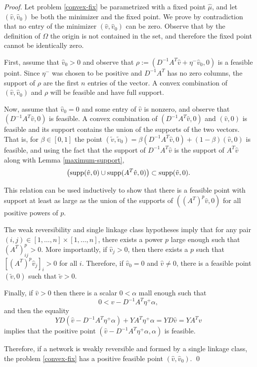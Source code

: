 \documentclass[smallextended]{svjour3}       %
\newcommand*{\supp}{\mbox{\rm supp}}
\newcommand*{\0}{\mathbf{0}}
\newcommand*{\1}{\mathbf{1}}
\begin{document}
\begin{proof}
	Let problem \eqref{convex-fix} be parametrized with a fixed point $\hat\mu$,
	and let $(\hat v, \hat v_0)$ be both the minimizer and the fixed point.  We
	prove by contradiction that no entry of the minimizer $(\hat{v},\hat{v}_0)$
	can be zero. Observe that by the definition of $\Omega$ the origin is not
	contained in the set, and therefore the fixed point cannot be identically
	zero. 

	First, assume that $\hat{v}_0>0$ and observe that $\rho := (D^{-1}A^T\hat v + \eta^-\hat v_0, 0)$ is 
	a feasible point. Since $\eta^-$ was chosen to be positive and 
	$D^{-1}A^T$ has no zero columns, the support of $\rho$ are the first $n$ entries 
	of the vector. A convex combination of $(\hat v,\hat v_0)$ and $\rho$ will 
	be feasible and have full support.

	Now, assume that $\hat v_0 = 0$ and some entry of $\hat v$ is nonzero, and
	observe that $(D^{-1}A^T\hat{v},0)$ is feasible. A convex combination of
	$(D^{-1}A^T\hat{v},0)$ and $(\hat{v},0)$ is feasible and its support
	contains the union of the supports of the two vectors.  That is, for $\beta \in
	[0,1]$ the point  $(\tilde{v}, \tilde{v}_0) = \beta (D^{-1}A^T\hat{v},0) +
	(1-\beta)(\hat{v},0)$ is feasible, and using the fact that the support of
	$D^{-1}A^T\hat v$ is the support of $A^T	\hat v$ along with Lemma
	\ref{maximum-support},
	\begin{equation} 
		\left(\supp(\hat{v},0) \cup \supp(A^T\hat{v},0)\right) \subset \supp(\tilde{v},0).
	  \label{monotonesets} 
	\end{equation} 
	
	This relation can be used inductively to show that there is a feasible point
	with support at least as large as the union of the supports of
	$((A^T)^p\hat{v}, 0)$ for all positive powers of $p$.

	The weak reversibility and single linkage class hypotheses imply that for any pair
	$(i,j)\in [1,\dots,n]\times [1,\dots,n]$, there exists a power $p$ large
	enough such that $(A^T)^p_{ij}>0$.  More importantly, if $\hat v_j > 0$, then
	there exists a $p$ such that $[(A^T)^p \hat v_j]_i > 0$ for all $i$.  
	Therefore, if $\hat{v}_0 = 0$ and $\hat{v} \neq 0$, there is a 
	feasible point $(\tilde{v},0)$ such that $\tilde{v} > 0$.  
	
	Finally, if $\hat v > 0$ then there is a scalar $ 0<\alpha$ mall enough such
	that 
	\[
	0< \hat v - D^{-1}A^T\eta^+ \alpha,
	\]
	and then the equality  
	\[
		YD(\hat v - D^{-1}A^T\eta^+\alpha)+YA^T\eta^+\alpha = YD\hat v = YA^T\hat v
	\]
	implies that the positive point $(\hat v - D^{-1}A^T\eta^+\alpha,\alpha)$ is
	feasible.

	Therefore, if a network is weakly reversible and formed by a single linkage class, the
	problem \eqref{convex-fix} has a positive feasible point $(\hat v, \hat
	v_0)$.  
   \qed
\end{proof}
\end{document}
